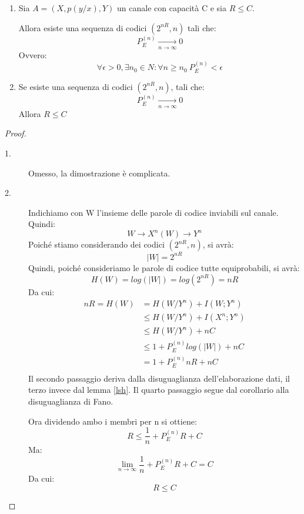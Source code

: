 \begin{teorema}
 \mbox{}

 \begin{enumerate}
  \item Sia $A=(X,p(y/x),Y)$ un canale con capacità C e sia $R \le C$.

        \noindent
        Allora esiste una sequenza di codici $(2^{nR},n)$ tali che:
        \[
         P_E^{(n)} \xrightarrow[n \to \infty]{} 0
        \]
        Ovvero:
        \[
         \forall \epsilon>0, \exists n_0 \in N: \forall n \ge n_0 \ P_E^{(n)}< \epsilon
        \]
   \item Se esiste una sequenza di codici $(2^{nR},n)$, tali che:
         \[
          P_E^{(n)} \xrightarrow[n \to \infty]{} 0
         \]
         Allora $R \le C$
 \end{enumerate}
 \begin{proof}
  \mbox{}
  \begin{description}
   \item[1.] Omesso, la dimostrazione è complicata.
   \item[2.] 
    
    Indichiamo con W l'insieme delle parole di codice inviabili sul canale.
    Quindi:
    \[
     W \to X^n(W) \to Y^n
    \]
    \noindent
    Poiché stiamo considerando dei codici $(2^{nR},n)$, si avrà:
    \[
     |W|=2^{nR}
    \]
    Quindi, poiché consideriamo le parole di codice tutte equiprobabili, si avrà:
    \[
     H(W)=log(|W|)=log(2^{nR})=nR
    \]
   Da cui:
   \[\begin{split}
    nR=H(W)&=H(W/Y^n)+I(W;Y^n) \\
        & \le H(W/Y^n)+I(X^n;Y^n) \\
        & \le H(W/Y^n)+nC \\
        & \le 1+P_E^{(n)} log(|W|) +nC \\
        & = 1+P_E^{(n)} nR +nC \\
     \end{split}
   \]
   Il secondo passaggio deriva dalla disuguaglianza dell'elaborazione dati, il terzo invece dal lemma \ref{lsh}.
   Il quarto passaggio segue dal corollario alla disuguaglianza di Fano.

   Ora dividendo ambo i membri per n si ottiene:
   \[
    R \le \frac{1}{n}+P_E^{(n)} R +C
   \]
   Ma:
   \[
    \lim_{n \to \infty} \frac{1}{n}+P_E^{(n)} R +C=C
   \]
   Da cui:
   \[
    R \le C
   \]

  \end{description}

 \end{proof}

\end{teorema}
